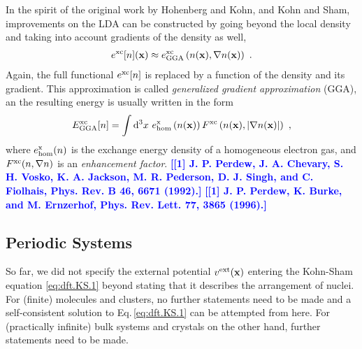 \documentclass[a4paper,12pt]{book}
\renewcommand{\d}{{\rm d}}
\newcommand{\CITE}[1]{\textcolor{blue}{{\bf [#1]}}}
\begin{document}
In the spirit of the original work by Hohenberg and Kohn, and Kohn and Sham, improvements on the LDA can be constructed by going beyond the local density and taking into account gradients of the density as well,
\begin{align}
	e^{\rm xc} [n] ({\bf x})
		\approx e^{\rm xc}_{\rm GGA} \left( n({\bf x}), \nabla n({\bf x}) \right)~.
	\label{eq:dft.exc.gga.1}
\end{align}
Again, the full functional $e^{\rm xc}[n]$ is replaced by a function of the density and its gradient. This approximation is called \emph{generalized gradient approximation} (GGA), an the resulting energy is usually written in the form
\begin{align}
		E^{\rm xc}_{\rm GGA}[n] 
		= \int \d^3 x ~ e^{\rm x}_{\rm hom} \left(n ({\bf x}) \right) 
			F^{\rm xc} \left(n ({\bf x}), \lvert \nabla n ({\bf x})\rvert \right)~,
		\label{eq:dft.GGA.1}
\end{align}
where $e^{\rm x}_{\rm hom}(n)$ is the exchange energy density of a homogeneous electron gas, and $F^{\rm xc}(n, \nabla n)$ is an \emph{enhancement factor}.
\CITE{[1] J. P. Perdew, J. A. Chevary, S. H. Vosko, K. A. Jackson, M. R. Pederson, D. J. Singh, and C. Fiolhais, Phys. Rev. B 46, 6671 (1992).}
\CITE{[1] J. P. Perdew, K. Burke, and M. Ernzerhof, Phys. Rev. Lett. 77, 3865 (1996).}

\subsection{Periodic Systems}
So far, we did not specify the external potential $v^{\rm ext} ({\bf x})$ entering the Kohn-Sham equation \eqref{eq:dft.KS.1} beyond stating that it describes the arrangement of nuclei. For (finite) molecules and clusters, no further statements need to be made and a self-consistent solution to Eq.\,\eqref{eq:dft.KS.1} can be attempted from here. For (practically infinite) bulk systems and crystals on the other hand, further statements need to be made.
\end{document}
